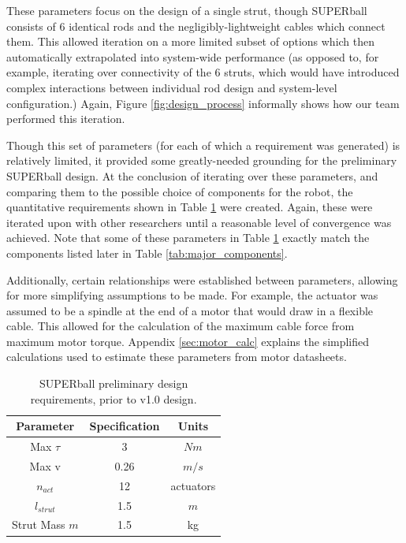 \documentclass[12pt]{report}
\begin{document}
These parameters focus on the design of a single strut, though SUPERball consists of 6 identical rods and the negligibly-lightweight cables which connect them.
This allowed iteration on a more limited subset of options which then automatically extrapolated into system-wide performance (as opposed to, for example, iterating over connectivity of the 6 struts, which would have introduced complex interactions between individual rod design and system-level configuration.)
Again, Figure \ref{fig:design_process} informally shows how our team performed this iteration.



Though this set of parameters (for each of which a requirement was generated) is relatively limited, it provided some greatly-needed grounding for the preliminary SUPERball design.
At the conclusion of iterating over these parameters, and comparing them to the possible choice of components for the robot, the quantitative requirements shown in Table \ref{tab:design_req} were created.
Again, these were iterated upon with other researchers until a reasonable level of convergence was achieved.
Note that some of these parameters in Table \ref{tab:design_req} exactly match the components listed later in Table \ref{tab:major_components}.

Additionally, certain relationships were established between parameters, allowing for more simplifying assumptions to be made.
For example, the actuator was assumed to be a spindle at the end of a motor that would draw in a flexible cable.
This allowed for the calculation of the maximum cable force from maximum motor torque.
Appendix \ref{sec:motor_calc} explains the simplified calculations used to estimate these parameters from motor datasheets.

\begin{table}[ht]
\caption{SUPERball preliminary design requirements, prior to v1.0 design.}%
\label{tab:design_req}%
\begin{center}%
\begin{tabular}{| c | c | c |}
\hline
Parameter & Specification & Units\\ \hline
Max $\tau$ & 3 & $Nm$ \\ \hline
Max v & 0.26 & $m/s$ \\ \hline
$n_{act}$ & 12 & actuators \\ \hline
$l_{strut}$ & 1.5 & $m$ \\ \hline
Strut Mass $m$ & 1.5 & kg \\ \hline
\end{tabular}%
\end{center}
\end{table}
\end{document}
